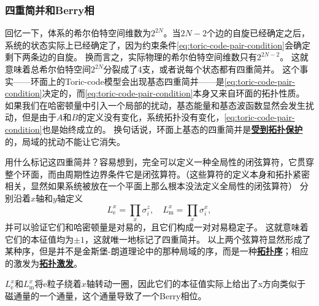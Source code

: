 \documentclass[hyperref, UTF8, a4paper]{ctexart}
\newcommand*{\concept}[1]{\underline{\textbf{#1}}}
\begin{document}
\subsubsection{四重简并和Berry相}

回忆一下，体系的希尔伯特空间维数为$2^{2N}$。当$2N-2$个边的自旋已经确定之后，系统的状态实际上已经确定了，因为约束条件\eqref{eq:toric-code-pair-condition}会确定剩下两条边的自旋。
换而言之，实际物理的希尔伯特空间维数只有$2^{2N-2}$。
这就意味着总希尔伯特空间$2^{2N}$分裂成了4支，或者说每个状态都有四重简并。
这个事实——环面上的Toric-code模型会出现基态四重简并——是\eqref{eq:toric-code-pair-condition}决定的，而\eqref{eq:toric-code-pair-condition}本身又来自环面的拓扑性质。
如果我们在哈密顿量中引入一个局部的扰动，基态能量和基态波函数显然会发生扰动，但是由于${A}$和${B}$的定义没有变化，系统拓扑没有变化，\eqref{eq:toric-code-pair-condition}也是始终成立的。
换句话说，环面上基态的四重简并是\concept{受到拓扑保护}的，局域的扰动不能让它消失。

用什么标记这四重简并？容易想到，完全可以定义一种全局性的闭弦算符，它贯穿整个环面，而由周期性边界条件它是闭弦算符。（这些算符的定义本身和拓扑紧密相关，显然如果系统被放在一个平面上那么根本没法定义全局性的闭弦算符）
分别沿着$x$轴和$y$轴定义
\begin{equation}
    {L}^x_\text{e} = \prod_{x} {\sigma}^z_i, \quad {L}^x_\text{m} = \prod_{x} {\sigma}^x_i,
\end{equation}
并可以验证它们和哈密顿量是对易的，且它们构成一对对易稳定子。
这就意味着它们的本征值均为$\pm 1$，这就唯一地标记了四重简并。
以上两个弦算符显然形成了某种序，但是并不是金斯堡-朗道理论中的那种局域的序，而是一种\concept{拓扑序}；相应的激发为\concept{拓扑激发}。

${L}^x_\text{e}$和${L}^x_\text{m}$将e粒子绕着$x$轴转动一圈，因此它们的本征值实际上给出了x方向类似于磁通量的一个通量，这个通量导致了一个Berry相位。
\end{document}
